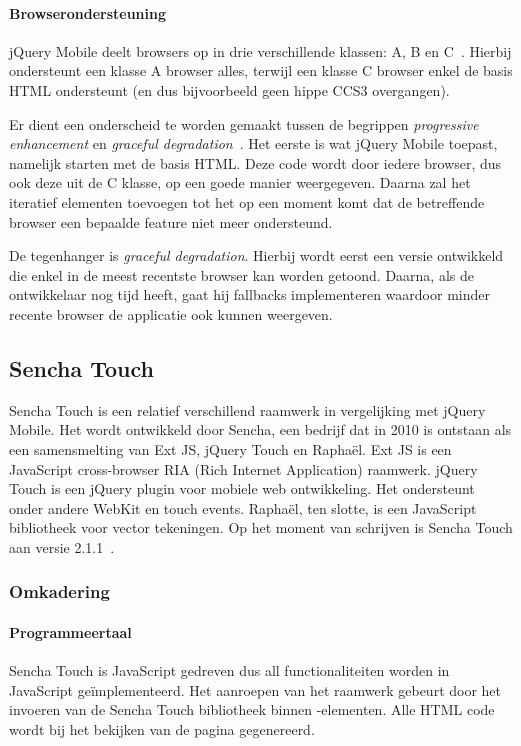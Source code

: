 \paragraph{Browserondersteuning}
\label{sec:jqm-browser-support}
jQuery Mobile deelt browsers op in drie verschillende klassen: A, B en C~\cite{JQuery2012d}. Hierbij ondersteunt een klasse A browser alles, terwijl een klasse C browser enkel de basis HTML ondersteunt (en dus bijvoorbeeld geen hippe CCS3 overgangen).

Er dient een onderscheid te worden gemaakt tussen de begrippen \emph{progressive enhancement} en \emph{graceful degradation}~\cite{Hens2012}. Het eerste is wat jQuery Mobile toepast, namelijk starten met de basis HTML. Deze code wordt door iedere browser, dus ook deze uit de C klasse, op een goede manier weergegeven. Daarna zal het iteratief elementen toevoegen tot het op een moment komt dat de betreffende browser een bepaalde feature niet meer ondersteund.

De tegenhanger is \emph{graceful degradation}. Hierbij wordt eerst een versie ontwikkeld die enkel in de meest recentste browser kan worden getoond. Daarna, als de ontwikkelaar nog tijd heeft, gaat hij fallbacks implementeren waardoor minder recente browser de applicatie ook kunnen weergeven.


\subsection{Sencha Touch}

Sencha Touch is een relatief verschillend raamwerk in vergelijking met jQuery Mobile.  Het wordt ontwikkeld door Sencha,  een bedrijf dat in 2010 is ontstaan als een samensmelting van Ext JS,  jQuery Touch en Raphaël.  Ext JS is een JavaScript cross-browser RIA (Rich Internet Application) raamwerk. jQuery Touch is een jQuery plugin voor mobiele web ontwikkeling.  Het ondersteunt onder andere WebKit en touch events.  Raphaël,  ten slotte,  is een JavaScript bibliotheek voor vector tekeningen. Op het moment van schrijven is Sencha Touch aan versie 2.1.1~\cite{Inc.}.  

\subsubsection{Omkadering}
\paragraph{Programmeertaal}
Sencha Touch is JavaScript gedreven dus all functionaliteiten worden in JavaScript geïmplementeerd. Het aanroepen van het raamwerk gebeurt door het invoeren van de Sencha Touch bibliotheek binnen -elementen.  Alle HTML code wordt bij het bekijken van de pagina gegenereerd.  

